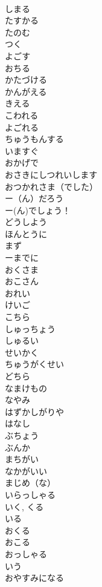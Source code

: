 \documentclass[8pt]{extreport}
\begin{document}
\begin{CJK}{UTF8}{min}
\\	しまる	
\\	たすかる	
\\	たのむ	
\\	つく	
\\	よごす	
\\	おちる	
\\	かたづける	
\\	かんがえる	
\\	きえる	
\\	こわれる	
\\	よごれる	
\\	ちゅうもんする	
\\	いますぐ	
\\	おかげで	
\\	おさきにしつれいします	
\\	おつかれさま（でした）	
\\	ー（ん）だろう	
\\	ー(ん)でしょう！
\\	どうしよう	
\\	ほんとうに	
\\	まず	
\\	ーまでに	
\\	おくさま	
\\	おこさん	
\\	おれい	
\\	けいご	
\\	こちら	
\\	しゅっちょう	
\\	しゅるい	
\\	せいかく	
\\	ちゅうがくせい	
\\	どちら	
\\	なまけもの	
\\	なやみ	
\\	はずかしがりや	
\\	はなし	
\\	ぶちょう	
\\	ぶんか	
\\	まちがい	
\\	なかがいい	
\\	まじめ（な）	
\\	いらっしゃる	
\\	いく, くる 
\\	いる
\\	おくる	
\\	おこる	
\\	おっしゃる	
\\	いう
\\	おやすみになる	

\end{CJK}
\end{document}
